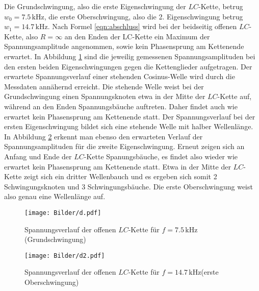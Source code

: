 Die Grundschwingung, also die erste Eigenschwingung der $LC$-Kette, betrug $w_{\mathrm{0}}=7.5 \,\si{\kilo\Hz}$, die erste Oberschwingung, also die 2. Eigenschwingung betrug $w_{\mathrm{1}}=14.7 \,\si{\kilo\Hz}$.
Nach Formel  \eqref{eqn:abschluss} wird bei der beidseitig offenen $LC$-Kette, also $R=\infty$ an den Enden der LC-Kette ein Maximum der Spannungsamplitude angenommen, sowie kein Phasensprung am Kettenende erwartet.
In Abbildung \ref{fig:plotdeins} sind die jeweilig gemessenen Spannungsamplituden bei den ersten beiden Eigenschwingungen gegen die Kettenglieder aufgetragen.
Der erwartete Spannungsverlauf einer stehenden Cosinus-Welle wird durch die Messdaten annähernd erreicht. Die stehende Welle weist bei der Grundschwingung einen Spannungsknoten etwa in der Mitte der $LC$-Kette auf, während an den Enden Spannungsbäuche auftreten.
Daher findet auch wie erwartet kein Phasensprung am Kettenende statt.
 Der Spannungsverlauf bei der ersten Eigenschwingung bildet sich eine stehende Welle mit halber Wellenlänge.
In Abbildung \ref{fig:plotd} erkennt man ebenso den erwarteten Verlauf der Spannungsamplituden für die zweite Eigenschwingung.
Erneut zeigen sich an Anfang und Ende der $LC$-Kette Spanungsbäuche, es findet also wieder wie erwartet kein Phasensprung am Kettenende statt.
Etwa in der Mitte der $LC$-Kette zeigt sich ein dritter Wellenbauch und es ergeben sich somit 2 Schwingungsknoten und 3 Schwingungsbäuche.
Die erste Oberschwingung weist also genau eine Wellenlänge auf.
\begin{figure}
  \centering
 \texttt{[image: Bilder/d.pdf]}
  \caption{Spannungsverlauf der offenen $LC$-Kette für $f=7.5 \,\si{\kilo\Hz}$(Grundschwingung)}
  \label{fig:plotdeins}
\end{figure}

\begin{figure}
  \centering
 \texttt{[image: Bilder/d2.pdf]}
  \caption{Spannungsverlauf der offenen $LC$-Kette für $f=14.7 \,\si{\kilo\Hz}$(erste Oberschwingung)}
  \label{fig:plotd}
\end{figure}

